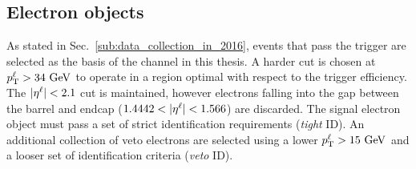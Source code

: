 \subsection{Electron objects}
\label{sub:el}

As stated in Sec.~\ref{sub:data_collection_in_2016}, events that pass the \eTrigger{} trigger are selected as the basis of the \eJets{} channel in this thesis.
A harder \LPT{} cut is chosen at $p_{\mathrm{T}}^{\ell}>34\mathrm{~Ge\hspace{-.08em}V}^{}$ to operate in a region optimal with respect to the trigger efficiency.
The $\lvert \eta^{\ell} \rvert{}<2.1$ cut is maintained, however electrons falling into the gap between the barrel and endcap ($1.4442<\lvert \eta^{\ell} \rvert<1.566$) are discarded.
The signal electron object must pass a set of strict identification requirements (\textit{tight} ID).
An additional collection of veto electrons are selected using a lower $p_{\mathrm{T}}^{\ell}>15\mathrm{~Ge\hspace{-.08em}V}^{}$ and a looser set of identification criteria (\textit{veto} ID).

